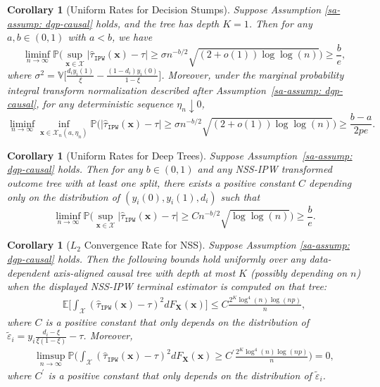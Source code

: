 \documentclass[10pt]{article}
\def\bx{\mathbf{x}}
\def\bX{\mathbf{X}}
\def\X{\mathcal{X}}
\def\E{\mathbb{E}}
\def\P{\mathbb{P}}
\def\V{\mathbb{V}}
\newtheorem{coro}[theorem]{Corollary}
\theoremstyle{definition}
\theoremstyle{remark}
\begin{document}
\begin{coro}[Uniform Rates for Decision Stumps]\label{coro: rates ipw}
    Suppose Assumption \ref{sa-assump: dgp-causal} holds, and the tree has depth $K = 1$. Then for any $ a,b \in (0, 1) $ with $ a < b $, we have
    \begin{equation*}
        \liminf_{n\to\infty} \mathbb{P}\Bigg(\sup_{\bx\in\mathcal{X}}|\hat\tau_{\mathtt{IPW}}(\bx) - \tau| \geq \sigma n^{-b/2}\sqrt{(2+o(1))\log\log(n)}\Bigg) \geq \frac{b}{e},
    \end{equation*}
    where $\sigma^2 = \V \Big[\frac{d_i y_i(1)}{\xi} - \frac{(1 - d_i) y_i(0)}{1 - \xi}\Big]$. Moreover, under the marginal probability integral transform normalization described after Assumption~\ref{sa-assump: dgp-causal}, for any deterministic sequence $\eta_n\downarrow0$,
    \begin{equation*} 
        \liminf_{n\to\infty} \inf_{\bx\in \mathcal{X}_n(a,\eta_n)} \mathbb{P}\Big(|\hat\tau_{\mathtt{IPW}}(\bx) - \tau| \geq \sigma n^{-b/2}\sqrt{(2+o(1))\log\log(n)}\Big) \geq \frac{b-a}{2 p e}.
    \end{equation*}
\end{coro}



\begin{coro}[Uniform Rates for Deep Trees]\label{sa-coro: uniform minimax ipw}
Suppose Assumption~\ref{sa-assump: dgp-causal} holds. Then for any $b \in (0, 1)$ and any NSS-IPW transformed outcome tree with at least one split, there exists a positive constant $C$ depending only on the distribution of $(y_i(0),y_i(1),d_i)$ such that
\[
\liminf_{n\to\infty}\mathbb{P}\Bigg(\sup_{\bx\in\mathcal{X}}|\hat\tau_{\mathtt{IPW}}(\bx) - \tau| \geq C n^{-b/2}\sqrt{\log\log(n)}\Bigg) \geq \frac{b}{e}.
\]
\end{coro}



\begin{coro}[$L_2$ Convergence Rate for NSS]\label{sa-coro: L2 consistency NSS ipw}
Suppose Assumption \ref{sa-assump: dgp-causal} holds. Then the following bounds hold uniformly over any data-dependent axis-aligned causal tree with depth at most $K$ (possibly depending on $n$) when the displayed NSS-IPW terminal estimator is computed on that tree:
\begin{align*}
    \E \bigg[ \int_{\X} (\hat\tau_{\mathtt{IPW}}(\bx) - \tau)^2 dF_{\bX}(\bx)\bigg] \leq C \frac{2^K \log^4(n) \log(np)}{n},
\end{align*}
where $C$ is a positive constant that only depends on the distribution of $\tilde{\varepsilon}_i = y_i \frac{d_i - \xi}{\xi(1 - \xi)} - \tau$. Moreover,
\begin{align*}
    \limsup_{n \to \infty}\P \bigg(\int_{\X} (\hat\tau_{\mathtt{IPW}}(\bx) - \tau)^2 dF_{\bX}(\bx) \geq C^{\prime} \frac{2^K \log^4(n) \log(np)}{n}\bigg) = 0,
\end{align*}
where $C^{\prime}$ is a positive constant that only depends on the distribution of $\tilde{\varepsilon}_i$.
\end{coro}
\end{document}
